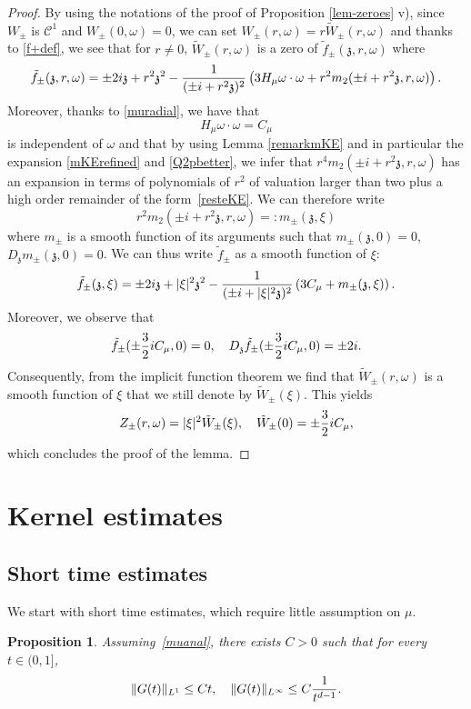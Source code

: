 \documentclass[11pt]{amsart}
\numberwithin{equation}{section}
\newtheorem{prop}{Proposition}[section]
\begin{document}
 \begin{proof}
 By using the notations of the proof of Proposition \ref{lem-zeroes} v),  since $W_\pm$ is $\mathscr{C}^1$ and $W_{\pm}(0,\omega)= 0$, we can set 
  $W_{\pm}(r, \omega )= r \tilde{W}_{\pm}(r,\omega)$ and thanks to \eqref{f+def}, we see that for $r \neq 0$, 
  $\tilde{W}_{\pm}(r,\omega)$ is a zero of $\tilde f_{\pm}( \mathfrak{z},r,\omega)$
  where
  $$  \tilde f_{\pm}(  \mathfrak{z},r,\omega)   
   =  \pm 2 i    \mathfrak{z} + r^2  \mathfrak{z}^2  -  { 1 \over  (\pm i + r^2  \mathfrak{z})^2} \left( 3 H_{\mu} \omega\cdot \omega +   r^2 m_{2}(\pm i  + r^2  \mathfrak{z}, r, \omega)\right).$$ 
   Moreover, thanks to \eqref{muradial}, we have that 
   $$ H_{\mu} \omega \cdot \omega=   C_{\mu}$$ is independent of $\omega$ and that
    by using Lemma \ref{remarkmKE} and in particular the expansion \eqref{mKErefined} and \eqref{Q2pbetter}, we infer that 
    $ r^4 m_{2}(\pm i  + r^2  \mathfrak{z}, r, \omega) $ has an expansion in terms of polynomials of  $r^2$  of valuation  larger than two plus a high order remainder of the form~\eqref{resteKE}. We can therefore write
    $$ r^2 m_{2}(\pm i  + r^2  \mathfrak{z}, r, \omega) =: m_{\pm}( \mathfrak{z}, \xi)$$
    where $m_{\pm}$ is a smooth function  of its arguments such that $m_{\pm}( \mathfrak{z}, 0) = 0, $ $D_{ \mathfrak{z}}m_{\pm}( \mathfrak{z},0)=0$.
    We can thus 
    write $\tilde f_{\pm}$ as a smooth function of $\xi$:
    $$  \tilde f_{\pm}(  \mathfrak{z},\xi)
    = \pm 2 i    \mathfrak{z} + | \xi|^2  \mathfrak{z}^2  -  { 1 \over  (\pm i + |\xi|^2  \mathfrak{z})^2} \left( 3 C_{\mu} +    m_{\pm}( \mathfrak{z}, \xi)\right).
    $$ 
    Moreover, we observe that
  $$ \tilde f_{\pm}( \pm{3 \over 2} i C_{\mu}, 0)= 0,  
   \quad D_{ \mathfrak{z}}  \tilde f_{\pm}( \pm {3 \over 2}   i C_{\mu}, 0)= \pm 2i.$$
    Consequently, from the implicit function theorem we find that $\tilde{W}_{\pm}(r, \omega)$ is a smooth function of $\xi$
     that we still denote by  $ \tilde{W}_{\pm}(\xi)$. This yields
     $$ Z_{\pm}(r, \omega) = | \xi|^2 \tilde{W}_{\pm}(\xi) , \quad   \tilde{W}_{\pm}(0) = \pm {3 \over 2} i C_{\mu},$$
     which concludes the proof of the lemma.
  \end{proof}  
 
\section{Kernel estimates}

\subsection{Short time estimates}
We start with short time estimates, which require little assumption on $\mu$.
\begin{prop}
\label{lemshort}
Assuming~\eqref{muanal}, there exists $C>0$ such that for every $t \in(0, 1]$, 
$$ \|G(t) \|_{L^1} \leq C t, \quad   \| G(t) \|_{L^\infty} \leq C { 1 \over t^{d-1}}.$$
\end{prop}
\end{document}
